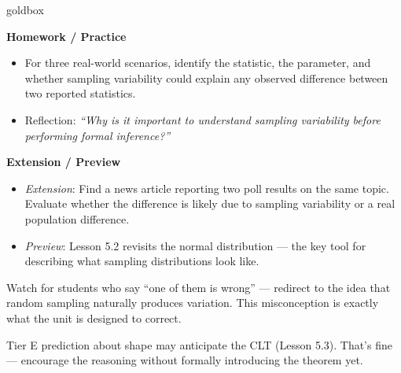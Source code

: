 \documentclass[10pt]{article}
\begin{document}
\begin{skillbox}{goldbox}
\begin{minipage}[t]{0.48\linewidth}
    \textbf{Homework / Practice}
    \begin{itemize}
        \item For three real-world scenarios, identify the statistic, the parameter, and
              whether sampling variability could explain any observed difference between
              two reported statistics.
        \item Reflection: \textit{``Why is it important to understand sampling variability
              before performing formal inference?''}
    \end{itemize}
\end{minipage}
\hfill
\begin{minipage}[t]{0.48\linewidth}
    \textbf{Extension / Preview}
    \begin{itemize}
        \item \textit{Extension}: Find a news article reporting two poll results on the
              same topic. Evaluate whether the difference is likely due to sampling
              variability or a real population difference.
        \item \textit{Preview}: Lesson 5.2 revisits the normal distribution --- the
              key tool for describing what sampling distributions look like.
    \end{itemize}
\end{minipage}
\end{skillbox}


\begin{teachernote}[Warm-Up]
Watch for students who say ``one of them is wrong'' --- redirect to the idea that
random sampling naturally produces variation. This misconception is exactly what the
unit is designed to correct.
\end{teachernote}

\begin{teachernote}
Tier E prediction about shape may anticipate the CLT (Lesson 5.3). That's fine ---
encourage the reasoning without formally introducing the theorem yet.
\end{teachernote}
\end{document}
